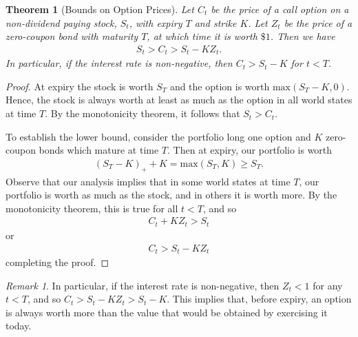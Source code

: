 \documentclass[12pt]{amsbook}
\theoremstyle{plain}
\newtheorem{theorem}{Theorem}
\theoremstyle{definition}
\theoremstyle{remark}
\newtheorem*{remark}{Remark}
\numberwithin{equation}{section}  %
\begin{document}
\begin{theorem}[Bounds on Option Prices]\label{thm:bound-op-prices}
	Let $C_t$ be the price of a call option on a non-dividend paying stock, 
	$S_t$, with
	expiry $T$ and strike $K$. Let $Z_t$ be the price of a zero-coupon bond 
	with maturity $T$, at which time
	it is worth $\$1$. 
	Then we have
	\begin{equation*}
		\begin{split}
			S_{t} > C_{t} > S_{t} - K Z_{t}.
		\end{split}
	\end{equation*}
	In particular, if the interest rate is non-negative, then $C_{t} >
	S_{t} - K$ for $t < T$. 
\end{theorem}
\begin{proof}
	At expiry the stock is worth $S_{T}$ and the option is worth
	$\text{max}(S_{T} - K, 0)$. Hence, the stock is always worth at least as 
	much
	as the option in all world states at time $T$. By the monotonicity theorem, 
	it follows
	that $S_{t} > C_{t}$. 

	To establish the lower bound, consider the portfolio long one option and 
	$K$ zero-coupon bonds which
	mature at time $T$. Then at expiry, our portfolio is worth
	\begin{equation*}
		\begin{split}
			{(S_{T} - K)}_{+} + K =  \text{max}(S_{T}, K) \ge S_{T}.
		\end{split}
	\end{equation*}
	Observe that our analysis implies that in some world states at time $T$, 
	our portfolio is worth as much as the stock, and in others it is worth 
	more. By the monotonicity theorem, this is true for all $t < T$, and so
	\begin{equation*}
		\begin{split}
			C_{t} + K Z_{t} > S_{t} 
		\end{split}
	\end{equation*}
	or
	\begin{equation*}
		\begin{split}
			C_{t} > S_{t} - K Z_{t}
		\end{split}
	\end{equation*}
	completing the proof.
\end{proof}
\begin{remark}\label{rem:nev-ex}
	In particular, if the interest rate is non-negative, then $Z_{t} < 1$ for 
	any $t < T$, and so
	$C_{t} > S_{t} - KZ_{t} > S_{t} - K$.
	This implies that, before expiry, an option is always 
	worth more than the value that would be obtained by exercising it today.
\end{remark}
\end{document}
